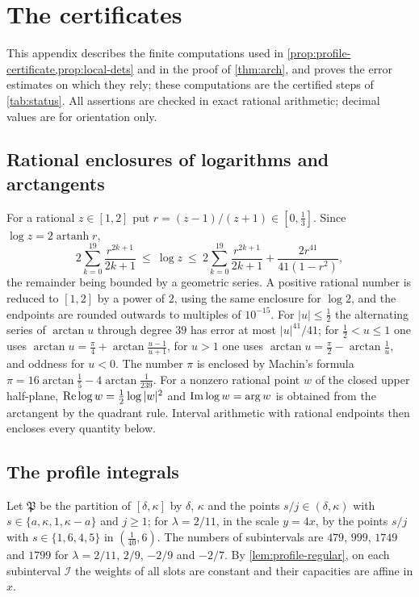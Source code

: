 \section{The certificates}\label{app:certificates}

This appendix describes the finite computations used in \cref{prop:profile-certificate,prop:local-dets} and in the proof of \cref{thm:arch}, and proves the error estimates on which they rely; these computations are the certified steps of \cref{tab:status}. All assertions are checked in exact rational arithmetic; decimal values are for orientation only.

\subsection{Rational enclosures of logarithms and arctangents}\label{sec:cert-intervals}
For a rational $z\in[1,2]$ put $r=(z-1)/(z+1)\in[0,\frac13]$. Since $\log z=2\operatorname{artanh}r$,
\[
2\sum_{k=0}^{19}\frac{r^{2k+1}}{2k+1}\ \le\ \log z\ \le\ 2\sum_{k=0}^{19}\frac{r^{2k+1}}{2k+1}+\frac{2r^{41}}{41(1-r^2)},
\]
the remainder being bounded by a geometric series. A positive rational number is reduced to $[1,2]$ by a power of $2$, using the same enclosure for $\log2$, and the endpoints are rounded outwards to multiples of $10^{-15}$. For $|u|\le\frac12$ the alternating series of $\arctan u$ through degree $39$ has error at most $|u|^{41}/41$; for $\frac12<u\le1$ one uses $\arctan u=\frac\pi4+\arctan\frac{u-1}{u+1}$, for $u>1$ one uses $\arctan u=\frac\pi2-\arctan\frac1u$, and oddness for $u<0$. The number $\pi$ is enclosed by Machin's formula $\pi=16\arctan\frac15-4\arctan\frac1{239}$. For a nonzero rational point $w$ of the closed upper half-plane, $\operatorname{Re}\log w=\frac12\log|w|^2$ and $\operatorname{Im}\log w=\arg w$ is obtained from the arctangent by the quadrant rule. Interval arithmetic with rational endpoints then encloses every quantity below.

\subsection{The profile integrals}\label{sec:cert-profile}
Let $\mathfrak P$ be the partition of $[\delta,\kappa]$ by $\delta$, $\kappa$ and the points $s/j\in(\delta,\kappa)$ with $s\in\{a,\kappa,1,\kappa-a\}$ and $j\ge1$; for $\lambda=2/11$, in the scale $y=4x$, by the points $s/j$ with $s\in\{1,6,4,5\}$ in $(\frac1{40},6)$. The numbers of subintervals are $479$, $999$, $1749$ and $1799$ for $\lambda=2/11$, $2/9$, $-2/9$ and $-2/7$. By \cref{lem:profile-regular}, on each subinterval $\mathcal I$ the weights of all slots are constant and their capacities are affine in $x$.

